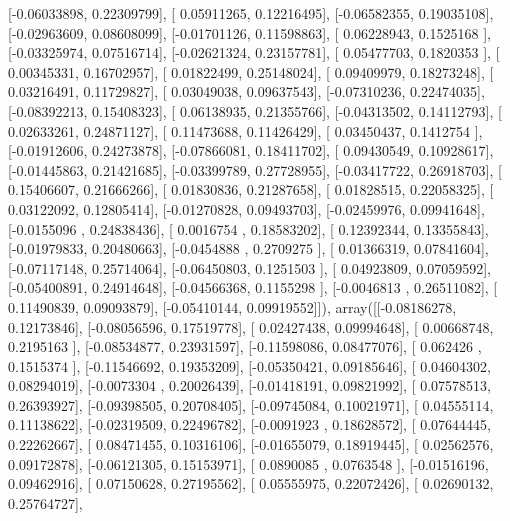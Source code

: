 \documentclass{article}
\begin{document}
       [-0.06033898,  0.22309799],
       [ 0.05911265,  0.12216495],
       [-0.06582355,  0.19035108],
       [-0.02963609,  0.08608099],
       [-0.01701126,  0.11598863],
       [ 0.06228943,  0.1525168 ],
       [-0.03325974,  0.07516714],
       [-0.02621324,  0.23157781],
       [ 0.05477703,  0.1820353 ],
       [ 0.00345331,  0.16702957],
       [ 0.01822499,  0.25148024],
       [ 0.09409979,  0.18273248],
       [ 0.03216491,  0.11729827],
       [ 0.03049038,  0.09637543],
       [-0.07310236,  0.22474035],
       [-0.08392213,  0.15408323],
       [ 0.06138935,  0.21355766],
       [-0.04313502,  0.14112793],
       [ 0.02633261,  0.24871127],
       [ 0.11473688,  0.11426429],
       [ 0.03450437,  0.1412754 ],
       [-0.01912606,  0.24273878],
       [-0.07866081,  0.18411702],
       [ 0.09430549,  0.10928617],
       [-0.01445863,  0.21421685],
       [-0.03399789,  0.27728955],
       [-0.03417722,  0.26918703],
       [ 0.15406607,  0.21666266],
       [ 0.01830836,  0.21287658],
       [ 0.01828515,  0.22058325],
       [ 0.03122092,  0.12805414],
       [-0.01270828,  0.09493703],
       [-0.02459976,  0.09941648],
       [-0.0155096 ,  0.24838436],
       [ 0.0016754 ,  0.18583202],
       [ 0.12392344,  0.13355843],
       [-0.01979833,  0.20480663],
       [-0.0454888 ,  0.2709275 ],
       [ 0.01366319,  0.07841604],
       [-0.07117148,  0.25714064],
       [-0.06450803,  0.1251503 ],
       [ 0.04923809,  0.07059592],
       [-0.05400891,  0.24914648],
       [-0.04566368,  0.1155298 ],
       [-0.0046813 ,  0.26511082],
       [ 0.11490839,  0.09093879],
       [-0.05410144,  0.09919552]]), array([[-0.08186278,  0.12173846],
       [-0.08056596,  0.17519778],
       [ 0.02427438,  0.09994648],
       [ 0.00668748,  0.2195163 ],
       [-0.08534877,  0.23931597],
       [-0.11598086,  0.08477076],
       [ 0.062426  ,  0.1515374 ],
       [-0.11546692,  0.19353209],
       [-0.05350421,  0.09185646],
       [ 0.04604302,  0.08294019],
       [-0.0073304 ,  0.20026439],
       [-0.01418191,  0.09821992],
       [ 0.07578513,  0.26393927],
       [-0.09398505,  0.20708405],
       [-0.09745084,  0.10021971],
       [ 0.04555114,  0.11138622],
       [-0.02319509,  0.22496782],
       [-0.0091923 ,  0.18628572],
       [ 0.07644445,  0.22262667],
       [ 0.08471455,  0.10316106],
       [-0.01655079,  0.18919445],
       [ 0.02562576,  0.09172878],
       [-0.06121305,  0.15153971],
       [ 0.0890085 ,  0.0763548 ],
       [-0.01516196,  0.09462916],
       [ 0.07150628,  0.27195562],
       [ 0.05555975,  0.22072426],
       [ 0.02690132,  0.25764727],
\end{document}
